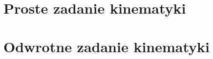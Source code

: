 \section{Proste zadanie kinematyki}

\section{Odwrotne zadanie kinematyki}
\label{sec:odwrotneZadanieKinematyki}